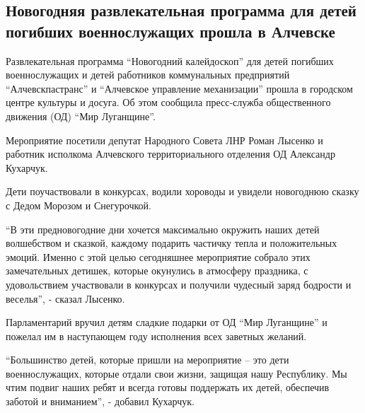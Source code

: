  
 
 
 
 
\subsection{Новогодняя развлекательная программа для детей погибших военнослужащих прошла в Алчевске}
\label{sec:25_12_2021.stz.news.lnr.lug_info.2.deti_novyj_god}


Развлекательная программа \enquote{Новогодний калейдоскоп} для детей погибших
военнослужащих и детей работников коммунальных предприятий \enquote{Алчевскпастранс} и
\enquote{Алчевское управление механизации} прошла в городском центре культуры и досуга.
Об этом сообщила пресс-служба общественного движения (ОД) \enquote{Мир Луганщине}.


Мероприятие посетили депутат Народного Совета ЛНР Роман Лысенко и работник
исполкома Алчевского территориального отделения ОД Александр Кухарчук.

Дети поучаствовали в конкурсах, водили хороводы и увидели новогоднюю сказку с
Дедом Морозом и Снегурочкой.

\enquote{В эти предновогодние дни хочется максимально окружить наших детей волшебством
и сказкой, каждому подарить частичку тепла и положительных эмоций. Именно с
этой целью сегодняшнее мероприятие собрало этих замечательных детишек, которые
окунулись в атмосферу праздника, с удовольствием участвовали в конкурсах и
получили чудесный заряд бодрости и веселья}, - сказал Лысенко.

Парламентарий вручил детям сладкие подарки от ОД \enquote{Мир Луганщине} и пожелал им в
наступающем году исполнения всех заветных желаний.

\enquote{Большинство детей, которые пришли на мероприятие – это дети военнослужащих,
которые отдали свои жизни, защищая нашу Республику. Мы чтим подвиг наших ребят
и всегда готовы поддержать их детей, обеспечив заботой и вниманием}, - добавил
Кухарчук.

